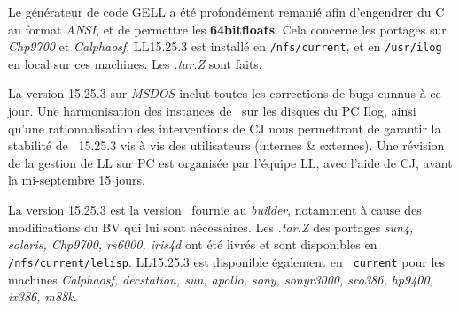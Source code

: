 Le g\'{e}n\'{e}rateur de code GELL a \'{e}t\'{e} profond\'{e}ment remani\'{e} afin
d'engendrer du C au format {\it ANSI}, et de permettre les {\bf 64bitfloats}.
Cela concerne les portages sur {\it Chp9700} et {\it Calphaosf}.
LL15.25.3 est install\'{e} en {\tt /nfs/current}, et en {\tt /usr/ilog}
en local sur ces machines.
Les {\it .tar.Z} sont faits.

La version 15.25.3 sur {\it MSDOS} inclut toutes les corrections de
bugs cunnus \`{a} ce jour. Une harmonisation des instances de \LeLisp\
sur les disques du PC Ilog, ainsi qu'une rationnalisation des
interventions de CJ nous permettront de garantir la stabilit\'{e} de
\LeLisp\ 15.25.3 vis \`{a} vis des utilisateurs (internes \& externes).
Une r\'{e}vision de la gestion de LL sur PC est organis\'{e}e par l'\'{e}quipe
LL, avec l'aide de CJ, avant la mi-septembre 15 jours.

La version 15.25.3 est la version \LeLisp\ fournie au {\it builder},
notamment \`{a} cause des modifications du BV qui lui sont n\'{e}cessaires.
Les {\it .tar.Z} des portages {\it sun4, solaris, Chp9700, rs6000,
iris4d} ont \'{e}t\'{e} livr\'{e}s et sont disponibles en {\tt
/nfs/current/lelisp}. LL15.25.3 est disponible \'{e}galement en {\tt
current} pour les machines {\it Calphaosf, decstation, sun, apollo,
sony, sonyr3000, sco386, hp9400, ix386, m88k}.
\End
